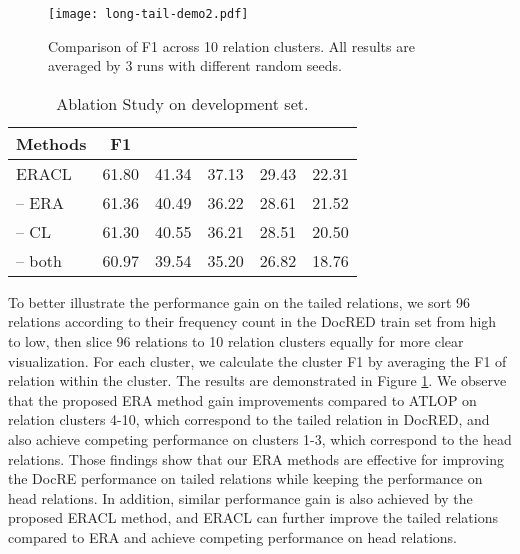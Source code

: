 \documentclass[11pt]{article}
\begin{document}
    \begin{figure}[h]
        \centering
        \texttt{[image: long-tail-demo2.pdf]}
        \caption{Comparison of F1 across 10 relation clusters. All results are averaged by 3 runs with different random seeds.}
        \label{fig:relationF1-demo}
    \end{figure}
    
      \begin{table*}[h]
        \centering
        \begin{tabular}{lccccc}
        \toprule
        Methods & F1 &  &  &  &  \\
        \midrule
        ERACL   & 61.80 & 41.34 & 37.13     & 29.43     & 22.31     \\
        \hline
        -- ERA   & 61.36 & 40.49 & 36.22     & 28.61     & 21.52     \\
        -- CL    & 61.30 & 40.55 & 36.21     & 28.51     & 20.50     \\
        -- both  & 60.97 & 39.54 & 35.20     & 26.82     & 18.76    \\
        \toprule
        \end{tabular}
        \caption{Ablation Study on development set.}
        \label{tb:ablation-study}
    \end{table*}
    
    To better illustrate the performance gain on the tailed relations, we sort 96 relations according to their frequency count in the DocRED train set from high to low, then slice 96 relations to 10 relation clusters equally for more clear visualization. For each cluster, we calculate the cluster F1 by averaging the F1 of relation within the cluster. The results are demonstrated in Figure \ref{fig:relationF1-demo}. We observe that the proposed ERA method gain improvements compared to ATLOP on relation clusters 4-10, which correspond to the tailed relation in DocRED, and also achieve competing performance on clusters 1-3, which correspond to the head relations. Those findings show that our ERA methods are effective for improving the DocRE performance on tailed relations while keeping the performance on head relations. In addition, similar performance gain is also achieved by the proposed ERACL method, and ERACL can further improve the tailed relations compared to ERA and achieve competing performance on head relations. 
    
\end{document}

